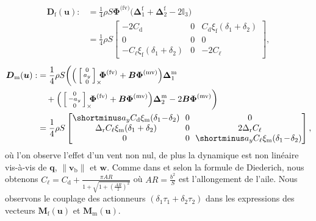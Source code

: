 \begin{align}
    \boldsymbol{D}_{\text{f}}(\boldsymbol{u}) :&=  \frac{1}{4} \rho S  \boldsymbol{\Phi}^{\text{(fv)}} \Big( \boldsymbol{\Delta}^{\text{f}}_1+  \boldsymbol{\Delta}^{\text{f}}_2 - 2 \mathbb{I}_{3} \Big)   \nonumber \\
 &= \frac{1}{4}\rho S  \begin{bmatrix}
       -2C_{\text{d}} & 0 & C_{\text{d}}\xi_{\text{f}}(\delta_{1} +\delta_{2})\\
       0 & 0 & 0\\
       -C_{\ell}\xi_{\text{f}}(\delta_{1} +\delta_{2}) & 0 & -2C_{\ell}
   \end{bmatrix}, \label{eq:df}
\end{align}
\begin{align}
    \nonumber
    \boldsymbol{D}_{\text{m}}(\boldsymbol{u}) :&= \frac{1}{4} \rho S  \bigg( \Big(\skewsym{\smallm{0 \\ a_y \\ 0}} \!\!\!  \boldsymbol{\Phi}^{\text{(fv)}}  +  \boldsymbol{B}  \boldsymbol{\Phi}^{\text{(mv)}} \Big)  \boldsymbol{\Delta}^{\text{m}}_1  \\
     &\quad  + \Big( \skewsym{\smallm{0 \\ -a_y \\ 0}} \!\!\!  \boldsymbol{\Phi}^{\text{(fv)}} +  \boldsymbol{B}  \boldsymbol{\Phi}^{\text{(mv)}}  \Big)  \boldsymbol{\Delta}^{\text{m}}_2 - 2  \boldsymbol{B}  \boldsymbol{\Phi}^{\text{(mv)}}  \bigg) \nonumber \\
     &= \frac{1}{4}\rho S  \begin{bmatrix}
              \shortminus a_{y}C_{\text{d}}\xi_{\text{m}}(\delta_{1} \!-\! \delta_{2}) \!\! & 0 & 0\\
              \Delta_{\text{r}}C_{\ell}\xi_{\text{m}}(\delta_{1} +\delta_{2})\!\! & 0 & 2\Delta_{\text{r}}C_{\ell}\\
             0 & 0 & \!\! \shortminus a_{y}C_{\ell}\xi_{\text{m}}(\delta_{1} \!-\!\delta_{2})
          \end{bmatrix},   \label{eq:dm}  
\end{align}
où l'on observe l'effet d'un vent non nul, de plus la dynamique est non linéaire vis-à-vis de $\boldsymbol{q}$, $\lVert \boldsymbol{v}_{\text{b}} \rVert$ et $\boldsymbol{w}$. Comme dans \cite[eqn. (10)]{olszaneckibarthHal-02542982} et selon la formule de Diederich, nous obtenons $C_{\ell} = C_{\text{d}} + \frac{\pi AR}{1+\sqrt{1+\left(\frac{AR}{2}\right)^{2}}}$ où $AR = \frac{b^{2}}{S}$ est l'allongement de l'aile.
Nous observons le couplage des actionneurs $\left(\delta_{1}\tau_{1} + \delta_{2}\tau_{2}\right)$  dans les expressions des vecteurs $\boldsymbol{M}_{\text{f}}(\boldsymbol{u})$ et $\boldsymbol{M}_{\text{m}}(\boldsymbol{u})$.


